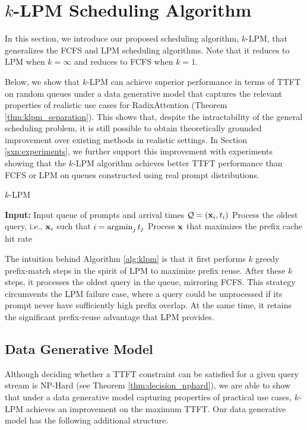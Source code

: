 \section{$k$-LPM Scheduling Algorithm}\label{sxn:klpm}

In this section, we introduce our proposed scheduling algorithm, $k$-LPM, that generalizes the FCFS and LPM scheduling algorithms. Note that it reduces to LPM when $k = \infty$ and reduces to FCFS when $k=1$. 

Below, we show that $k$-LPM can achieve superior performance in terms of TTFT on random queues under a data generative model that captures the relevant properties of realistic use cases for RadixAttention (Theorem \ref{thm:klpm_separation}). This shows that, despite the intractability of the general scheduling problem, it is still possible to obtain theoretically grounded improvement over existing methods in realistic settings. In Section \ref{sxn:experiments}, we further support this improvement with experiments showing that the $k$-LPM algorithm achieves better TTFT performance than FCFS or LPM on queues constructed using real prompt distributions.

\begin{algorithm}
\caption{$k$-LPM}
\label{alg:klpm}
\begin{algorithmic}[1]
\State \textbf{Input:} Input queue of prompts and arrival times $\mathcal{Q}=(\mathbf{x}_i, t_i)$
    \State Process the oldest query, i.e., $\mathbf{x}_i$ such that $i = \mathop{\mathrm{argmin}}_j t_j$
        \State Process $\mathbf{x}$ that maximizes the prefix cache hit rate
    \EndFor
\EndWhile
\end{algorithmic}
\end{algorithm}

The intuition behind Algorithm \ref{alg:klpm} is that it first performs $k$ greedy prefix-match steps in the spirit of LPM to maximize prefix reuse. 
After these $k$ steps, it processes the oldest query in the queue, mirroring FCFS. 
This strategy circumvents the LPM failure case, where a query could be unprocessed if its prompt never have sufficiently high prefix overlap. 
At the same time, it retains the significant prefix-reuse advantage that LPM provides.

\subsection{Data Generative Model}

Although deciding whether a TTFT constraint can be satisfied for a given query stream is NP-Hard (see Theorem \ref{thm:decision_nphard}), we are able to show that under a data generative model capturing properties of practical use cases, $k$-LPM achieves an improvement on the maximum TTFT. Our data generative model has the following additional structure.


